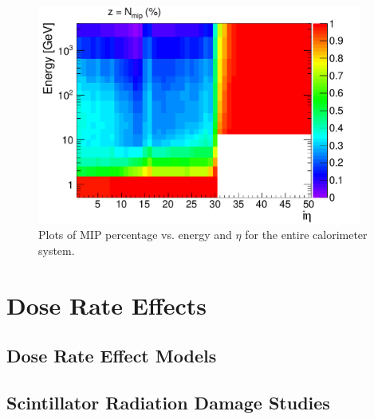 \begin{figure}[hbtp]
\begin{center}
\includegraphics[width=0.95\textwidth]{figures/all_mip.pdf}
\caption{Plots of MIP percentage vs. energy and $\eta$ for the entire calorimeter system.}
\label{fig:allmippct}
\end{center}
\end{figure}

\section{Dose Rate Effects}

\subsection{Dose Rate Effect Models}

\subsection{Scintillator Radiation Damage Studies}